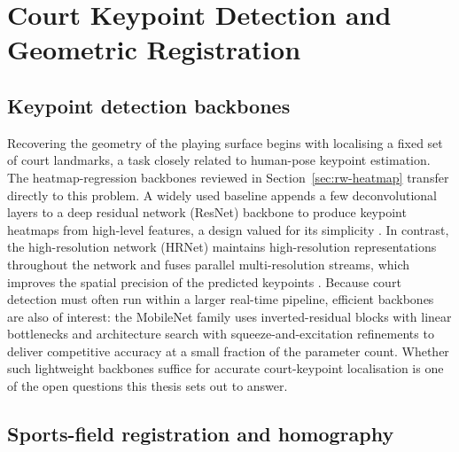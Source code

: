 \section{Court Keypoint Detection and Geometric Registration}
\label{sec:rw-court}

\subsection{Keypoint detection backbones}
\label{sec:rw-keypoint}

Recovering the geometry of the playing surface begins with localising a fixed
set of court landmarks, a task closely related to human-pose keypoint
estimation. The heatmap-regression backbones reviewed in
Section~\ref{sec:rw-heatmap} transfer directly to this problem. A widely used
baseline appends a few deconvolutional layers to a deep residual network
(ResNet) backbone \cite{he2016resnet} to produce keypoint heatmaps from
high-level features, a design valued for its simplicity \cite{xiao2018simplebaselines}.
In contrast, the high-resolution network (HRNet) maintains high-resolution
representations throughout the network and fuses parallel multi-resolution
streams, which improves the spatial precision of the predicted keypoints
\cite{sun2019hrnet}. Because court detection must often run within a larger
real-time pipeline, efficient backbones are also of interest: the MobileNet
family uses inverted-residual blocks with linear bottlenecks \cite{sandler2018mobilenetv2}
and architecture search with squeeze-and-excitation refinements
\cite{howard2019mobilenetv3} to deliver competitive accuracy at a small
fraction of the parameter count. Whether such lightweight backbones suffice for
accurate court-keypoint localisation is one of the open questions this thesis
sets out to answer.

\subsection{Sports-field registration and homography}
\label{sec:rw-homography}

